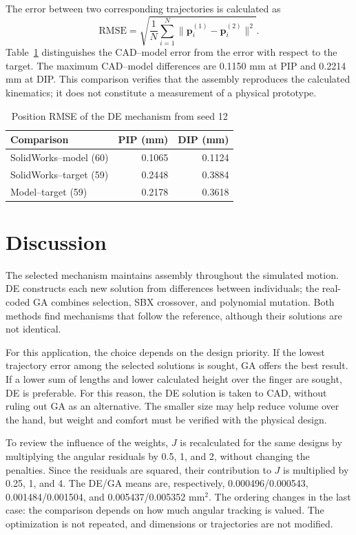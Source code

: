 \documentclass[conference,letterpaper]{IEEEtran}
\begin{document}
The error between two corresponding trajectories is calculated as
\begin{equation}
\mathrm{RMSE}=\sqrt{\frac{1}{N}\sum_{i=1}^{N}\|\mathbf p_i^{(1)}-\mathbf p_i^{(2)}\|^2}.
\end{equation}
Table~\ref{tab:simulacion} distinguishes the CAD--model error from the error with respect to the target. The maximum CAD--model differences are 0.1150 mm at PIP and 0.2214 mm at DIP. This comparison verifies that the assembly reproduces the calculated kinematics; it does not constitute a measurement of a physical prototype.

\begin{table}[t]
\caption{Position RMSE of the DE mechanism from seed 12}
\label{tab:simulacion}\centering\footnotesize
\begin{tabular}{lrr}\toprule Comparison & PIP (mm) & DIP (mm)\\\midrule
SolidWorks--model (60)&0.1065&0.1124\\
SolidWorks--target (59)&0.2448&0.3884\\
Model--target (59)&0.2178&0.3618\\\bottomrule
\end{tabular}
\end{table}

\section{Discussion}
The selected mechanism maintains assembly throughout the simulated motion. DE constructs each new solution from differences between individuals; the real-coded GA combines selection, SBX crossover, and polynomial mutation. Both methods find mechanisms that follow the reference, although their solutions are not identical.

For this application, the choice depends on the design priority. If the lowest trajectory error among the selected solutions is sought, GA offers the best result. If a lower sum of lengths and lower calculated height over the finger are sought, DE is preferable. For this reason, the DE solution is taken to CAD, without ruling out GA as an alternative. The smaller size may help reduce volume over the hand, but weight and comfort must be verified with the physical design.

To review the influence of the weights, $J$ is recalculated for the same designs by multiplying the angular residuals by 0.5, 1, and 2, without changing the penalties. Since the residuals are squared, their contribution to $J$ is multiplied by 0.25, 1, and 4. The DE/GA means are, respectively, 0.000496/0.000543, 0.001484/0.001504, and 0.005437/0.005352 mm$^2$. The ordering changes in the last case: the comparison depends on how much angular tracking is valued. The optimization is not repeated, and dimensions or trajectories are not modified.
\end{document}

